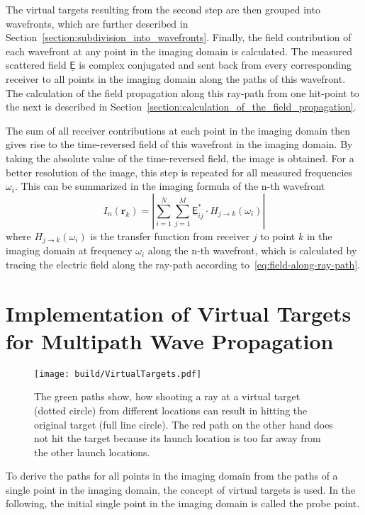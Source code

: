 The virtual targets resulting from the second step are then grouped into wavefronts, which are further described in Section~\ref{section:subdivision_into_wavefronts}.
Finally, the field contribution of each wavefront at any point in the imaging domain is calculated.
The measured scattered field \(\underline{\mathsf{E}}\) is complex conjugated and sent back from every corresponding receiver to all points in the imaging domain along the paths of this wavefront.
The calculation of the field propagation along this ray-path from one hit-point to the next is described in Section~\ref{section:calculation_of_the_field_propagation}.

The sum of all receiver contributions at each point in the imaging domain then gives rise to the time-reversed field of this wavefront in the imaging domain.
By taking the absolute value of the time-reversed field, the image is obtained.
For a better resolution of the image, this step is repeated for all measured frequencies \(\omega_i\).
This can be summarized in the imaging formula of the n-th wavefront
\begin{equation}
    I_n(\bm{r}_k) = |\sum_{i=1}^{N} \sum_{j=1}^{M} \underline{\mathsf{E}}_{ij}^* \cdot H_{j \rightarrow k}(\omega_i)|
\end{equation}
where \(H_{j \rightarrow k}(\omega_i)\) is the transfer function from receiver \(j\) to point \(k\) in the imaging domain at frequency \(\omega_i\) along the n-th wavefront, which is calculated by tracing the electric field along the ray-path according to~\eqref{eq:field-along-ray-path}.


\section{Implementation of Virtual Targets for Multipath Wave Propagation}\label{section:virtual_targets}

\begin{figure}[ht]
    \centering
    \texttt{[image: build/VirtualTargets.pdf]}
    \caption{The green paths show, how shooting a ray at a virtual target (dotted circle) from different locations can result in hitting the original target (full line circle). The red path on the other hand does not hit the target because its launch location is too far away from the other launch locations.}\label{fig:virtual_targets}
\end{figure}

To derive the paths for all points in the imaging domain from the paths of a single point in the imaging domain, the concept of virtual targets is used.
In the following, the initial single point in the imaging domain is called the probe point.

